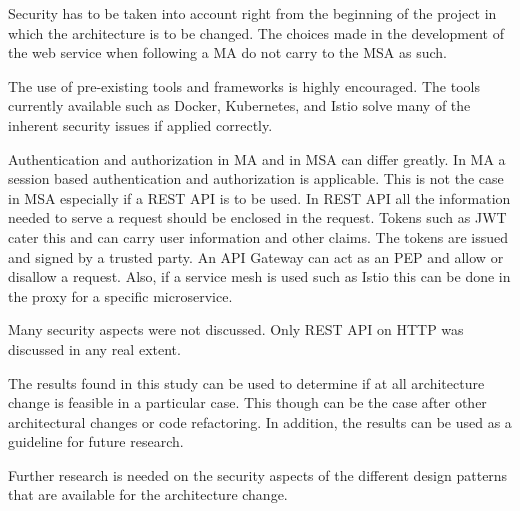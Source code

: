 \begin{sloppypar}
    Security has to be taken into account right from the beginning of the
    project in which the architecture is to be changed. The choices made in the
    development of the web service when following a MA do not carry to the MSA
    as such.
\end{sloppypar}
\begin{sloppypar}
    The use of pre-existing tools and frameworks is highly encouraged. The tools
    currently available such as Docker, Kubernetes, and Istio solve many of the
    inherent security issues if applied correctly.
\end{sloppypar}
\begin{sloppypar}
    Authentication and authorization in MA and in MSA can differ greatly. In MA
    a session based authentication and authorization is applicable. This is not
    the case in MSA especially if a REST API is to be used. In REST API all the
    information needed to serve a request should be enclosed in the request.
    Tokens such as JWT cater this and can carry user information and other
    claims. The tokens are issued and signed by a trusted party. An API Gateway
    can act as an PEP and allow or disallow a request. Also, if a service mesh
    is used such as Istio this can be done in the proxy for a specific
    microservice.
\end{sloppypar}
\begin{sloppypar}
    Many security aspects were not discussed. Only REST API on HTTP was
    discussed in any real extent. 
\end{sloppypar}
\begin{sloppypar}
    The results found in this study can be used to determine if at all
    architecture change is feasible in a particular case. This though can be the
    case after other architectural changes or code refactoring. In addition, the
    results can be used as a guideline for future research.
\end{sloppypar}
\begin{sloppypar}
    Further research is needed on the security aspects of the different design
    patterns that are available for the architecture change.
\end{sloppypar}


